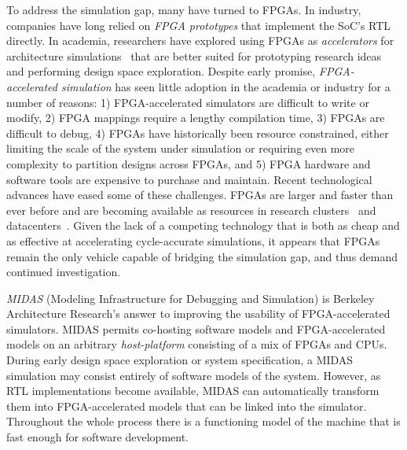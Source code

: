 To address the simulation gap, many have turned to FPGAs. In industry,
companies have long relied on \emph{FPGA prototypes} that implement the SoC's
RTL directly. In academia, researchers have explored using FPGAs as \emph{accelerators}
for architecture simulations~\cite{fast, fame, hasim, protoflex,ramp} that are
better suited for prototyping research ideas and performing design space
exploration. Despite early promise, \emph{FPGA-accelerated simulation} has seen
little adoption in the academia or industry for a number of reasons: 1)
FPGA-accelerated simulators are difficult to write or modify, 2) FPGA mappings
require a lengthy compilation time, 3) FPGAs are difficult to debug, 4) FPGAs
have historically been resource constrained, either limiting the scale of the
system under simulation or requiring even more complexity to partition designs
across FPGAs, and 5) FPGA hardware and software tools are expensive to purchase
and maintain.  Recent technological advances have eased some of these
challenges. FPGAs are larger and faster than ever before and are becoming
available as resources in research clusters~\cite{catapultannounce} and
datacenters~\cite{amazonf1}.  Given the lack of a competing technology that is
both as cheap and as effective at accelerating cycle-accurate simulations, it
appears that FPGAs remain the only vehicle capable of bridging the simulation
gap, and thus demand continued investigation.

\emph{MIDAS} (Modeling Infrastructure for Debugging and Simulation) is Berkeley
Architecture Research's answer to improving the usability of FPGA-accelerated
simulators. MIDAS permits co-hosting software models and FPGA-accelerated
models on an arbitrary \emph{host-platform} consisting of a mix of FPGAs and
CPUs.  During early design space exploration or system specification, a MIDAS
simulation may consist entirely of software models of the system.  However, as
RTL implementations become available, MIDAS can automatically transform them
into FPGA-accelerated models that can be linked into the simulator. Throughout
the whole process there is a functioning model of the machine that is fast
enough for software development.


